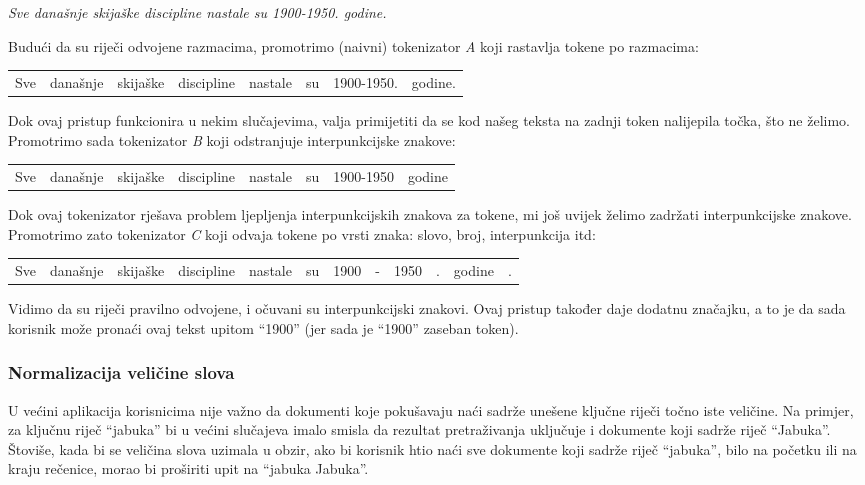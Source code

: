 \documentclass[a4paper,twoside,12pt]{scrreprt}
\newenvironment{nscenter}
 {\par\nopagebreak\centering}
 {\parskip=0pt\par\noindent\ignorespacesafterend}
\begin{document}
\begin{quoting}
  \textit{Sve današnje skijaške discipline nastale su 1900-1950. godine.}
\end{quoting}

Budući da su riječi odvojene razmacima, promotrimo (naivni) tokenizator \textit{A} koji rastavlja tokene po razmacima:

\begin{nscenter}
  \begin{tabular}{|c|c|c|c|c|c|c|c|}
    Sve & današnje & skijaške & discipline & nastale & su & 1900-1950. & godine.
  \end{tabular}
\end{nscenter}

Dok ovaj pristup funkcionira u nekim slučajevima, valja primijetiti da se kod našeg teksta na zadnji token nalijepila točka, što ne želimo. Promotrimo sada tokenizator \textit{B} koji odstranjuje interpunkcijske znakove:

\begin{nscenter}
  \begin{tabular}{|c|c|c|c|c|c|c|c|}
    Sve & današnje & skijaške & discipline & nastale & su & 1900-1950 & godine
  \end{tabular}
\end{nscenter}

Dok ovaj tokenizator rješava problem ljepljenja interpunkcijskih znakova za tokene, mi još uvijek želimo zadržati interpunkcijske znakove. Promotrimo zato tokenizator \textit{C} koji odvaja tokene po vrsti znaka: slovo, broj, interpunkcija itd:

\begin{nscenter}
  \begin{tabular}{|c|c|c|c|c|c|c|c|c|c|c|c|}
    Sve & današnje & skijaške & discipline & nastale & su & 1900 & - & 1950 & . & godine & .
  \end{tabular}
\end{nscenter}

Vidimo da su riječi pravilno odvojene, i očuvani su interpunkcijski znakovi. Ovaj pristup također daje dodatnu značajku, a to je da sada korisnik može pronaći ovaj tekst upitom ``1900'' (jer sada je ``1900'' zaseban token).

\subsubsection{Normalizacija veličine slova}

U većini aplikacija korisnicima nije važno da dokumenti koje pokušavaju naći sadrže unešene ključne riječi točno iste veličine. Na primjer, za ključnu riječ ``jabuka'' bi u većini slučajeva imalo smisla da rezultat pretraživanja uključuje i dokumente koji sadrže riječ ``Jabuka''. Štoviše, kada bi se veličina slova uzimala u obzir, ako bi korisnik htio naći sve dokumente koji sadrže riječ ``jabuka'', bilo na početku ili na kraju rečenice, morao bi proširiti upit na ``jabuka Jabuka''.
\end{document}
